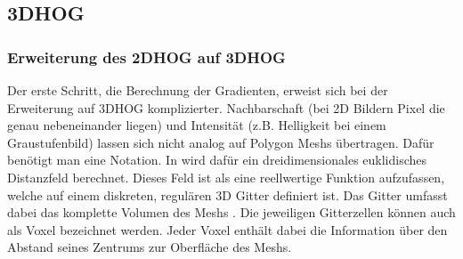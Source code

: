 

\subsection{3DHOG}


\subsubsection{Erweiterung des 2DHOG auf 3DHOG}
Der erste Schritt, die Berechnung der Gradienten, erweist sich bei der Erweiterung auf 3DHOG komplizierter. Nachbarschaft (bei 2D Bildern Pixel die genau nebeneinander liegen) und Intensität (z.B. Helligkeit bei einem Graustufenbild) lassen sich nicht analog auf Polygon Meshs übertragen. Dafür benötigt man eine Notation. In \cite{scherer2010histograms} wird dafür ein dreidimensionales euklidisches 
Distanzfeld berechnet. Dieses Feld ist als eine reellwertige Funktion aufzufassen, welche auf einem diskreten, regulären 3D Gitter definiert ist. Das Gitter umfasst dabei das komplette Volumen des Meshs \cite{scherer2010histograms}. Die jeweiligen Gitterzellen können auch als Voxel bezeichnet werden. Jeder Voxel enthält dabei die Information über den Abstand seines Zentrums zur Oberfläche des Meshs. 

